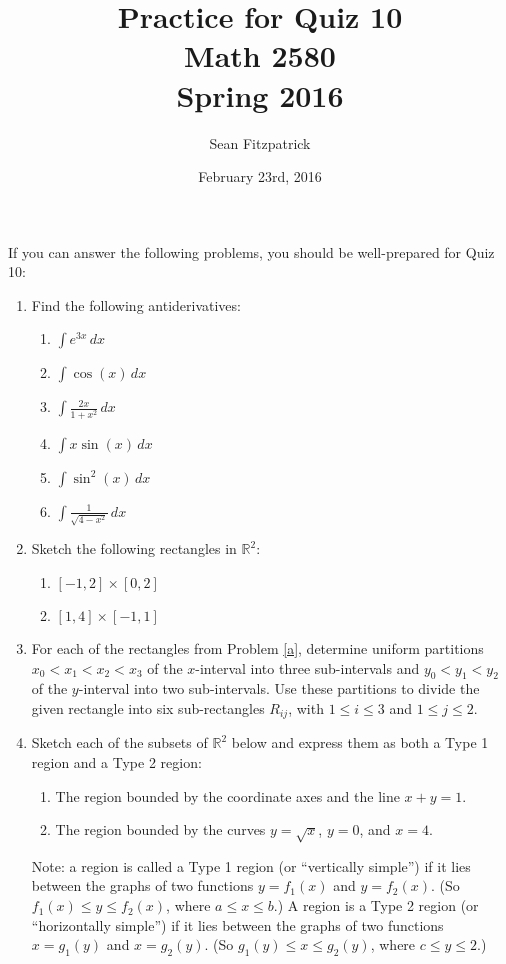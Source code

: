 \documentclass[letterpaper,12pt]{article}
\title{Practice for Quiz 10\\Math 2580\\Spring 2016}
\author{Sean Fitzpatrick}
\date{February 23rd, 2016}
\newcommand{\R}{\mathbb{R}}
\newcommand{\di}{\displaystyle}
\begin{document}
 \maketitle

If you can answer the following problems, you should be well-prepared for Quiz 10:



\begin{enumerate}
 \item Find the following antiderivatives:
\begin{multicols}{2}
\begin{enumerate}
 \item $\di \int e^{3x}\,dx$
 \item $\di \int \cos(x)\,dx$
 \item $\di \int \frac{2x}{1+x^2}\,dx$
 \item $\di \int x\sin(x)\,dx$
 \item $\di \int \sin^2(x)\,dx$
 \item $\di \int \frac{1}{\sqrt{4-x^2}}\,dx$
\end{enumerate}
\end{multicols}
 \item Sketch the following rectangles in $\R^2$:\label{a}
\begin{multicols}{2}
\begin{enumerate}
 \item $[-1,2]\times [0,2]$
 \item $[1,4]\times [-1,1]$
\end{enumerate}
\end{multicols}
 \item For each of the rectangles from Problem \ref{a}, determine uniform partitions $x_0<x_1<x_2<x_3$ of the $x$-interval into three sub-intervals and $y_0<y_1<y_2$ of the $y$-interval into two sub-intervals. Use these partitions to divide the given rectangle into six sub-rectangles $R_{ij}$, with $1\leq i\leq 3$ and $1\leq j\leq 2$. 
 \item Sketch each of the subsets of $\R^2$ below and express them as both a Type 1 region and a Type 2 region:
\begin{enumerate}
 \item The region bounded by the coordinate axes and the line $x+y=1$.
 \item The region bounded by the curves $y=\sqrt{x}$, $y=0$, and $x=4$.
\end{enumerate}
Note: a region is called a Type 1 region (or ``vertically simple'') if it lies between the graphs of two functions $y=f_1(x)$ and $y=f_2(x)$. (So $f_1(x)\leq y\leq f_2(x)$, where $a\leq x\leq b$.) A region is a Type 2 region (or ``horizontally simple'') if it lies between the graphs of two functions $x=g_1(y)$ and $x=g_2(y)$. (So $g_1(y)\leq x\leq g_2(y)$, where $c\leq y\leq 2$.)
 \end{enumerate}
\end{document}
